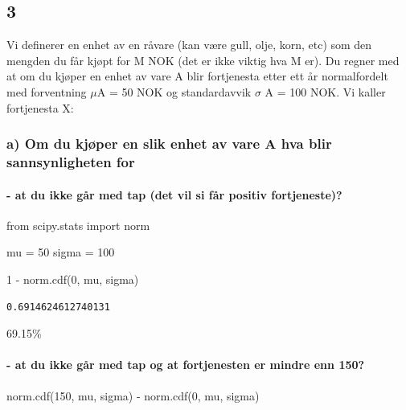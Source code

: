 \documentclass[
  12pt,
  a4paper,
  DIV=11,
  numbers=noendperiod]{scrartcl}
\let\oldparagraph\paragraph
\renewcommand{\paragraph}[1]{\oldparagraph{#1}\mbox{}}
\newenvironment{Shaded}{\begin{snugshade}}{\end{snugshade}}
\newcommand{\DecValTok}[1]{\textcolor[rgb]{0.68,0.00,0.00}{#1}}
\newcommand{\ImportTok}[1]{\textcolor[rgb]{0.00,0.46,0.62}{#1}}
\newcommand{\NormalTok}[1]{\textcolor[rgb]{0.00,0.23,0.31}{#1}}
\newcommand{\OperatorTok}[1]{\textcolor[rgb]{0.37,0.37,0.37}{#1}}
\begin{document}
\subsection{3}\label{section-2}

Vi definerer en enhet av en råvare (kan være gull, olje, korn, etc) som
den mengden du får kjøpt for M NOK (det er ikke viktig hva M er). Du
regner med at om du kjøper en enhet av vare A blir fortjenesta etter ett
år normalfordelt med forventning \(\mu\)A = 50 NOK og standardavvik
\(\sigma\) A = 100 NOK. Vi kaller fortjenesta X:

\subsubsection{a) Om du kjøper en slik enhet av vare A hva blir
sannsynligheten
for}\label{a-om-du-kjuxf8per-en-slik-enhet-av-vare-a-hva-blir-sannsynligheten-for}

\paragraph{- at du ikke går med tap (det vil si får positiv
fortjeneste)?}\label{at-du-ikke-guxe5r-med-tap-det-vil-si-fuxe5r-positiv-fortjeneste}

\begin{Shaded}
\begin{Highlighting}[]
\ImportTok{from}\NormalTok{ scipy.stats }\ImportTok{import}\NormalTok{ norm}


\NormalTok{mu }\OperatorTok{=} \DecValTok{50}  
\NormalTok{sigma }\OperatorTok{=} \DecValTok{100}  




\DecValTok{1} \OperatorTok{{-}}\NormalTok{ norm.cdf(}\DecValTok{0}\NormalTok{, mu, sigma)}
\end{Highlighting}
\end{Shaded}

\begin{verbatim}
0.6914624612740131
\end{verbatim}

69.15\%

\paragraph{- at du ikke går med tap og at fortjenesten er mindre enn
150?}\label{at-du-ikke-guxe5r-med-tap-og-at-fortjenesten-er-mindre-enn-150}

\begin{Shaded}
\begin{Highlighting}[]
\NormalTok{norm.cdf(}\DecValTok{150}\NormalTok{, mu, sigma) }\OperatorTok{{-}}\NormalTok{ norm.cdf(}\DecValTok{0}\NormalTok{, mu, sigma)}
\end{Highlighting}
\end{Shaded}
\end{document}
